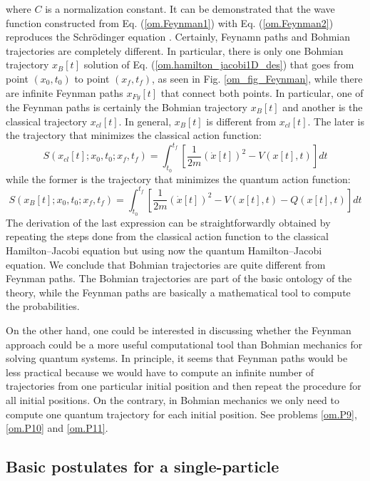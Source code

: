 \documentclass[nofootinbib, secnumarabic, amsmath, nobibnotes,10pt,aps,pra]{revtex4-1}
\newcommand{\fref}[1]{Fig. \ref{#1}}
\newcommand{\eref}[1]{Eq. (\ref{#1})}
\begin{document}
\noindent where $C$ is a normalization constant. It can be
demonstrated that the wave function constructed from
\eref{om.Feynman1} with \eref{om.Feynman2} reproduces the
Schr\"odinger equation \cite{om.feynmann1965}. Certainly, Feynamn
paths and Bohmian trajectories are completely different. In
particular, there is only one Bohmian trajectory $x\!_{B}[t]$ solution
of \eref{om.hamilton_jacobi1D_des} that goes from point $(x_0,t_0)$
to point $(x\!_f,t\!_f)$, as seen in \fref{om_fig_Feynman}, while there
are infinite Feynman paths $x_\textit{Fy}[t]$ that connect both points. In
particular, one of the Feynman paths is certainly the Bohmian trajectory  $x\!_{B}[t]$ and
another is the classical trajectory $x_{cl}[t]$. In general,
$x\!_{B}[t]$ is different from $x_{cl}[t]$. The later is the
trajectory that minimizes the classical action function:
\begin{equation}
\label{om.action_function_clas}
 S(x_{cl}[t];x_0,t_0;x_f,t_f) = \int_{t_0}^{t_f} \left[ \frac {1} {2m} (\dot{x}[t])^2 -V(x[t],t) \right] dt
\end{equation}
while the former is the trajectory that minimizes the quantum action function:
\begin{equation}
\label{om.action_function_quan}
 S(x_{B}[t];x_0,t_0;x_f,t_f) =\! \int_{t_0}^{t_f} \left[ \frac {1} {2m} (\dot{x}[t])^2 -V(x[t],t) -Q(x[t],t) \right] dt
\end{equation}
The derivation of the last expression can be straightforwardly obtained by repeating the steps done from the classical action function to the classical Hamilton--Jacobi equation but using now the quantum Hamilton--Jacobi equation. We conclude that Bohmian trajectories are quite different from Feynman paths. The Bohmian trajectories are part of the basic ontology of the theory, while the Feynman paths are basically a mathematical tool to compute the probabilities.  


On the other hand, one could be interested in discussing whether the Feynman approach could be a more useful computational tool than Bohmian mechanics for solving quantum systems. In principle, it seems that Feynman paths would be less practical because we would have to compute an infinite number of trajectories from one particular initial position and then repeat the procedure for all initial positions. On the contrary, in Bohmian mechanics we only need to compute one quantum trajectory for each initial position. See problems \ref{om.P9}, \ref{om.P10} and \ref{om.P11}.  


\subsection{Basic postulates  for a single-particle}\label{om.sec_single.6}
\end{document}
